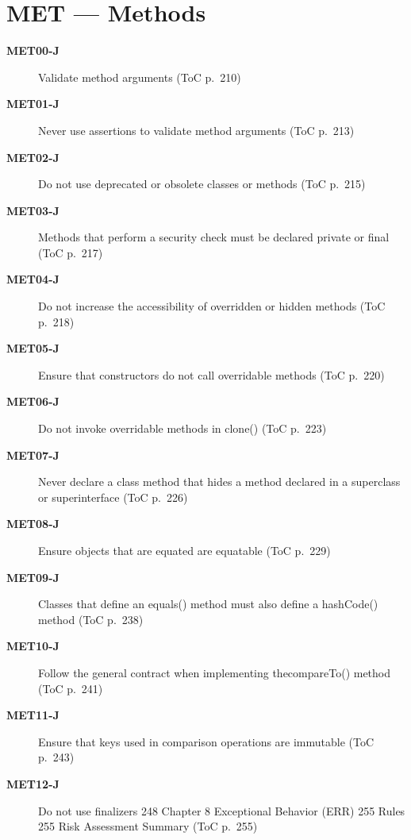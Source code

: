 \documentclass[11pt]{report}
\begin{document}
\chapter{MET — Methods}
\begin{description}
\item[\textbf{MET00-J}] Validate method arguments (ToC p.~210)
\item[\textbf{MET01-J}] Never use assertions to validate method arguments (ToC p.~213)
\item[\textbf{MET02-J}] Do not use deprecated or obsolete classes or methods (ToC p.~215)
\item[\textbf{MET03-J}] Methods that perform a security check must be declared private or final (ToC p.~217)
\item[\textbf{MET04-J}] Do not increase the accessibility of overridden or hidden methods (ToC p.~218)
\item[\textbf{MET05-J}] Ensure that constructors do not call overridable methods (ToC p.~220)
\item[\textbf{MET06-J}] Do not invoke overridable methods in clone() (ToC p.~223)
\item[\textbf{MET07-J}] Never declare a class method that hides a method declared in a superclass or superinterface (ToC p.~226)
\item[\textbf{MET08-J}] Ensure objects that are equated are equatable (ToC p.~229)
\item[\textbf{MET09-J}] Classes that define an equals() method must also define a hashCode() method (ToC p.~238)
\item[\textbf{MET10-J}] Follow the general contract when implementing thecompareTo() method (ToC p.~241)
\item[\textbf{MET11-J}] Ensure that keys used in comparison operations are immutable (ToC p.~243)
\item[\textbf{MET12-J}] Do not use finalizers 248 Chapter 8 Exceptional Behavior (ERR) 255 Rules 255 Risk Assessment Summary (ToC p.~255)
\end{description}
\clearpage
\end{document}
